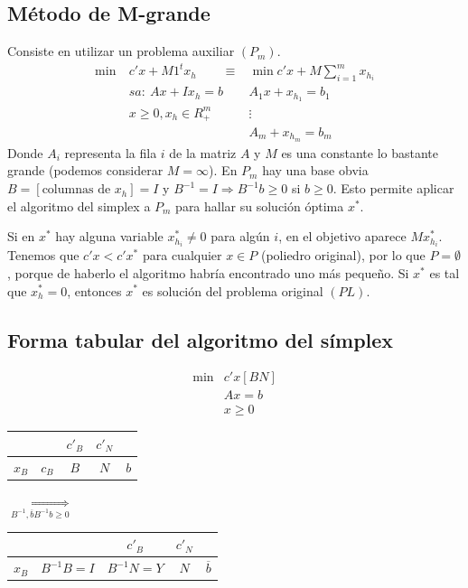 \documentclass[PM.tex]{subfiles}
\begin{document}
\subsection{Método de M-grande}
Consiste en utilizar un problema auxiliar $(P_m)$.
\begin{align*}
 \min\ & c'x+M1^t x_h\qquad \equiv &\min c'x+M\sum_{i=1}^m x_{h_i}\\
&sa:\ Ax+Ix_h=b              & A_1x+ x_{h_1}=b_1 \\
& x\geq 0, x_h\in R^m_+    & \vdots \\
&                          & A_m+ x_{h_m}=b_m
\end{align*}
Donde $A_i$ representa la fila $i$ de la matriz $A$ y $M$ es una constante lo bastante grande (podemos considerar $M=\infty$).  En $P_m$ hay una base obvia $B=[\text{columnas de }x_h]=I$ y $B^{-1}=I\Rightarrow B^{-1}b\geq 0$ si $b\geq 0$. Esto permite aplicar el algoritmo del simplex a $P_m$ para hallar su solución óptima $x^*$. 

Si en $x^*$ hay alguna variable $x^*_{h_i}\neq 0$ para algún $i$, en el objetivo aparece $Mx^*_{h_i}$. Tenemos que $c'x<c'x^*$ para cualquier $x\in P$ (poliedro original), por lo que $P=\emptyset$, porque de haberlo el algoritmo habría encontrado uno más pequeño.  Si $x^*$ es tal que $x^*_h=0$, entonces $x^*$ es solución del problema original $(PL)$. 

\subsection{Forma tabular del algoritmo del símplex}

\begin{align*}
\min & c'x [B N]\\
& Ax=b\\
&x\geq 0
\end{align*}
\begin{tabular}{|c|c| c| c|c|}
\hline
 & & $c'_B$ & $c'_N$ & \\
 \hline
 $x_B$ & $c_B$ & $B$ & $N$ & $b$\\
 \hline

\end{tabular}$\underset{B^{-1},\overline{b}B^{-1}b\geq 0}{\Longrightarrow}$
\begin{tabular}{|c|c| c| c|c|}
\hline
 & & $c'_B$ & $c'_N$ & \\
 \hline
 $x_B$ & $B^{-1}B=I$ & $B^{-1}N=Y$ & $N$ & $\overline{b}$\\
 \hline

\end{tabular}
\end{document}
